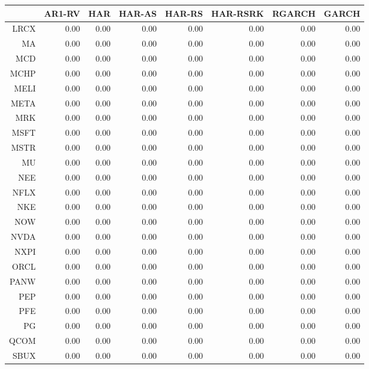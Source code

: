\begin{table}[ht]
\centering
\begin{tabular}{rrrrrrrr}
  \hline
 & AR1-RV & HAR & HAR-AS & HAR-RS & HAR-RSRK & RGARCH & GARCH \\ 
  \hline
LRCX & 0.00 & 0.00 & 0.00 & 0.00 & 0.00 & 0.00 & 0.00 \\ 
  MA & 0.00 & 0.00 & 0.00 & 0.00 & 0.00 & 0.00 & 0.00 \\ 
  MCD & 0.00 & 0.00 & 0.00 & 0.00 & 0.00 & 0.00 & 0.00 \\ 
  MCHP & 0.00 & 0.00 & 0.00 & 0.00 & 0.00 & 0.00 & 0.00 \\ 
  MELI & 0.00 & 0.00 & 0.00 & 0.00 & 0.00 & 0.00 & 0.00 \\ 
  META & 0.00 & 0.00 & 0.00 & 0.00 & 0.00 & 0.00 & 0.00 \\ 
  MRK & 0.00 & 0.00 & 0.00 & 0.00 & 0.00 & 0.00 & 0.00 \\ 
  MSFT & 0.00 & 0.00 & 0.00 & 0.00 & 0.00 & 0.00 & 0.00 \\ 
  MSTR & 0.00 & 0.00 & 0.00 & 0.00 & 0.00 & 0.00 & 0.00 \\ 
  MU & 0.00 & 0.00 & 0.00 & 0.00 & 0.00 & 0.00 & 0.00 \\ 
  NEE & 0.00 & 0.00 & 0.00 & 0.00 & 0.00 & 0.00 & 0.00 \\ 
  NFLX & 0.00 & 0.00 & 0.00 & 0.00 & 0.00 & 0.00 & 0.00 \\ 
  NKE & 0.00 & 0.00 & 0.00 & 0.00 & 0.00 & 0.00 & 0.00 \\ 
  NOW & 0.00 & 0.00 & 0.00 & 0.00 & 0.00 & 0.00 & 0.00 \\ 
  NVDA & 0.00 & 0.00 & 0.00 & 0.00 & 0.00 & 0.00 & 0.00 \\ 
  NXPI & 0.00 & 0.00 & 0.00 & 0.00 & 0.00 & 0.00 & 0.00 \\ 
  ORCL & 0.00 & 0.00 & 0.00 & 0.00 & 0.00 & 0.00 & 0.00 \\ 
  PANW & 0.00 & 0.00 & 0.00 & 0.00 & 0.00 & 0.00 & 0.00 \\ 
  PEP & 0.00 & 0.00 & 0.00 & 0.00 & 0.00 & 0.00 & 0.00 \\ 
  PFE & 0.00 & 0.00 & 0.00 & 0.00 & 0.00 & 0.00 & 0.00 \\ 
  PG & 0.00 & 0.00 & 0.00 & 0.00 & 0.00 & 0.00 & 0.00 \\ 
  QCOM & 0.00 & 0.00 & 0.00 & 0.00 & 0.00 & 0.00 & 0.00 \\ 
  SBUX & 0.00 & 0.00 & 0.00 & 0.00 & 0.00 & 0.00 & 0.00 \\ 

\end{tabular}
\end{table}
